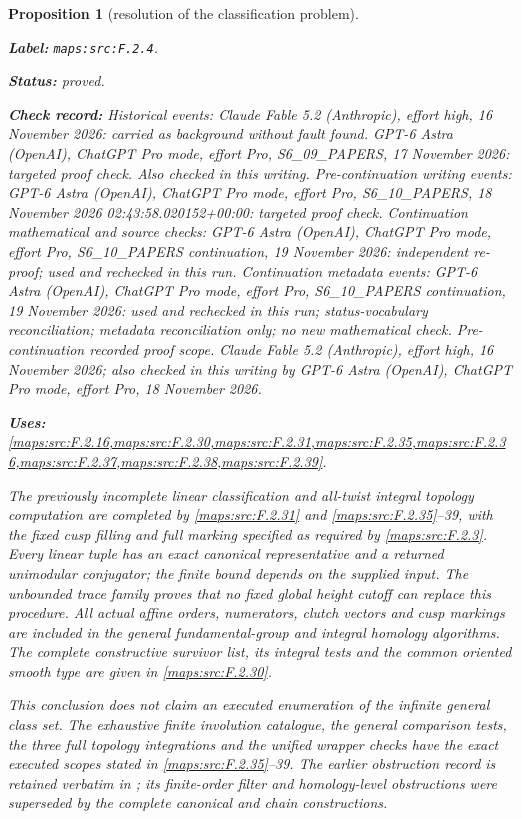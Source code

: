 \documentclass[11pt,a4paper]{article}
\newtheorem{proposition}[proposition]{Proposition}
\theoremstyle{definition}
\newcommand{\StatementRecord}[4]{\par\smallskip\begingroup\upshape\raggedright\noindent\textbf{Label:} \nolinkurl{#1}.\par\noindent\textbf{Status:} #2.\par\noindent\textbf{Check record:} #3.\par\noindent\textbf{Uses:} #4.\par\endgroup\smallskip}
\begin{document}
\begin{proposition}[resolution of the classification problem]\label{maps:src:F.2.4}
\StatementRecord{maps:src:F.2.4}{proved}{Historical events: Claude Fable 5.2 (Anthropic), effort high, 16 November 2026: carried as background without fault found. GPT-6 Astra (OpenAI), ChatGPT Pro mode, effort Pro, S6\_09\_PAPERS, 17 November 2026: targeted proof check. Also checked in this writing. Pre-continuation writing events: GPT-6 Astra (OpenAI), ChatGPT Pro mode, effort Pro, S6\_10\_PAPERS, 18 November 2026 02:43:58.020152+00:00: targeted proof check. Continuation mathematical and source checks: GPT-6 Astra (OpenAI), ChatGPT Pro mode, effort Pro, S6\_10\_PAPERS continuation, 19 November 2026: independent re-proof; used and rechecked in this run. Continuation metadata events: GPT-6 Astra (OpenAI), ChatGPT Pro mode, effort Pro, S6\_10\_PAPERS continuation, 19 November 2026: used and rechecked in this run; status-vocabulary reconciliation; metadata reconciliation only; no new mathematical check. \emph{Pre-continuation recorded proof scope.} Claude Fable 5.2 (Anthropic), effort high, 16 November 2026; also checked in this writing by GPT-6 Astra (OpenAI), ChatGPT Pro mode, effort Pro, 18 November 2026}{\cref{maps:src:F.2.16,maps:src:F.2.30,maps:src:F.2.31,maps:src:F.2.35,maps:src:F.2.36,maps:src:F.2.37,maps:src:F.2.38,maps:src:F.2.39}}


The previously incomplete linear classification and all-twist
integral topology computation are completed by \ref{maps:src:F.2.31} and
\ref{maps:src:F.2.35}--39, with the fixed cusp filling and full marking
specified as required by \ref{maps:src:F.2.3}.  Every linear tuple has an
exact canonical representative and a returned unimodular
conjugator; the finite bound depends on the supplied input.
The unbounded trace family proves that no fixed global
height cutoff can replace this procedure.  All actual affine
orders, numerators, clutch vectors and cusp markings are
included in the general fundamental-group and integral
homology algorithms.  The complete constructive survivor
list, its integral tests and the common oriented smooth
type are given in \ref{maps:src:F.2.30}.

This conclusion does not claim an executed enumeration of
the infinite general class set.  The exhaustive finite
involution catalogue, the general comparison tests, the
three full topology integrations and the unified wrapper
checks have the exact executed scopes stated in \ref{maps:src:F.2.35}--39.
The earlier obstruction record is retained verbatim in
; its finite-order
filter and homology-level obstructions were superseded by
the complete canonical and chain constructions.


\end{proposition}
\end{document}
